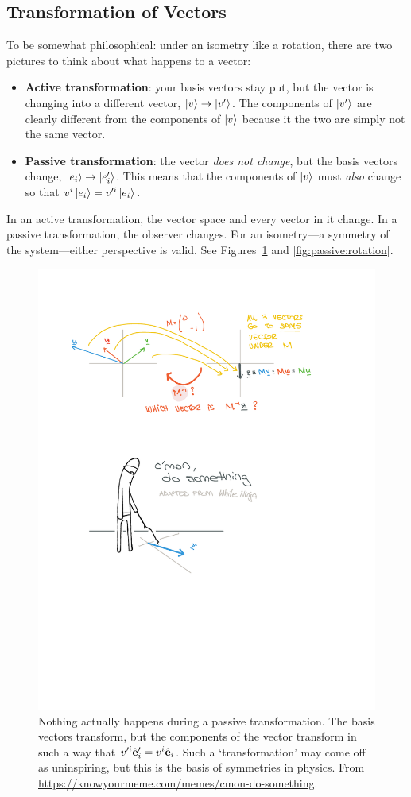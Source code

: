 \subsection{Transformation of Vectors}\label{sec:active:passive}

To be somewhat philosophical: under an isometry like a rotation, there are two pictures to think about what happens to a vector:
\begin{itemize}
    \item \textbf{Active transformation}: your basis vectors stay put, but the vector is changing into a different vector, $\left|v\right\rangle \to \left|v'\right\rangle$. The components of $\left|v'\right\rangle$ are clearly different from the components of $\left|v\right\rangle$ because it the two are simply not the same vector.
    \item \textbf{Passive transformation}: the vector \emph{does not change}, but the basis vectors change, $\left|e_i\right\rangle \to \left|e'_i\right\rangle$. This means that the components of $\left|v\right\rangle$ must \emph{also} change so that $v^i\left|e_i\right\rangle = v'^{i}\left|e_i\right\rangle$.
\end{itemize}
In an active transformation, the vector space and every vector in it change. In a passive transformation, the observer changes. For an isometry---a symmetry of the system---either perspective is valid. See Figures~\ref{fig:do:something} and \ref{fig:passive:rotation}.
% 

\begin{figure}[tb]
    \centering
    \includegraphics[width=.5\textwidth]{figures/passivetransform_dosomething.pdf}
    \caption{
        Nothing actually happens during a passive transformation. The basis vectors transform, but the components of the vector transform in such a way that $v'^i\hat{\mathbf{e}}'_i = v^i\hat{\mathbf{e}}_i$. Such a `transformation' may come off as uninspiring, but this is the basis of symmetries in physics. 
        From \url{https://knowyourmeme.com/memes/cmon-do-something}.
    }
    \label{fig:do:something}
\end{figure}


